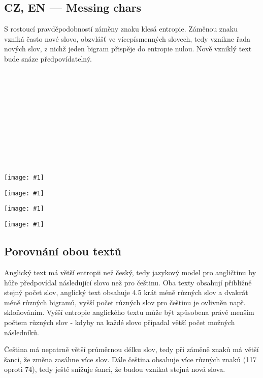 \documentclass[12pt, a4paper]{report}
\theoremstyle{remark}
\def\obrazek#1#2{
\begin{center}
 		\texttt{[image: \#1]}%
\end{center}
 }
\begin{document}
\subsection*{CZ, EN --- Messing chars}
S rostoucí pravděpodobností záměny znaku klesá entropie.
Záměnou znaku vzniká často nové slovo, obzvlášť ve vícepísmenných slovech, tedy vznikne řada nových slov, z nichž jeden bigram přispěje do entropie nulou. Nově vzniklý text bude snáze předpovídatelný.  

\

\

\




\

\

\






\begin{multicols}{2}
\obrazek{img-cz-words.png}{0.5}
\columnbreak
\obrazek{img-en-words.png}{0.5}
\end{multicols}
\begin{multicols}{2}
\obrazek{img-cz-chars.png}{0.45}
\columnbreak
\obrazek{img-en-chars.png}{0.45}
\end{multicols}


\subsection*{Porovnání obou textů}
Anglický text má větší entropii než český, tedy jazykový model pro angličtinu by hůře předpovídal následující slovo než pro češtinu. Oba texty obsahují přibližně stejný počet slov, anglický text obsahuje 4.5 krát méně různých slov a dvakrát méně různých bigramů, vyšší počet různých slov pro češtinu je ovlivněn např. skloňováním. Vyšší entropie anglického textu může být způsobena právě menším počtem různých slov - kdyby na každé slovo připadal větší počet možných následníků. 

Čeština má nepatrně větší průměrnou délku slov, tedy při záměně znaků má větší šanci, že změna zasáhne více slov. Dále čeština obsahuje více různých znaků (117 oproti 74), tedy ještě snižuje šanci, že budou vznikat stejná nová slova.
\end{document}
